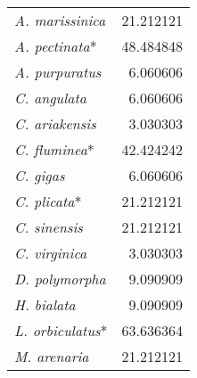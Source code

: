 \documentclass[../main.tex]{subfiles}
\begin{document}
\begin{longtable}{lr}
\textit{A. marissinica}              & 21.212121                                                                                                          \\
\textit{A. pectinata}*               & 48.484848                                                                                                          \\
\textit{A. purpuratus}               & 6.060606                                                                                                           \\
\textit{C. angulata}                 & 6.060606                                                                                                           \\
\textit{C. ariakensis}               & 3.030303                                                                                                           \\
\textit{C. fluminea}*                & 42.424242                                                                                                          \\
\textit{C. gigas}                    & 6.060606                                                                                                           \\
\textit{C. plicata}*                 & 21.212121                                                                                                          \\
\textit{C. sinensis}                 & 21.212121                                                                                                          \\
\textit{C. virginica}                & 3.030303                                                                                                           \\
\textit{D. polymorpha}               & 9.090909                                                                                                           \\
\textit{H. bialata}                  & 9.090909                                                                                                           \\
\textit{L. orbiculatus}*             & 63.636364                                                                                                          \\
\textit{M. arenaria}                 & 21.212121                                                                                                          \\

\end{longtable}
\end{document}
